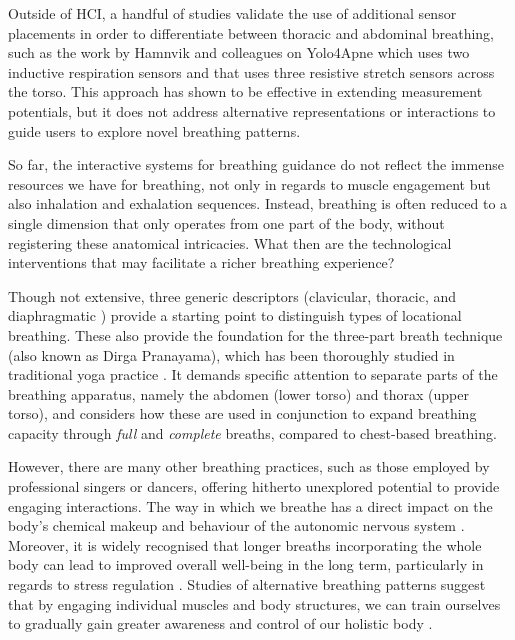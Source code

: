 Outside of HCI, a handful of studies validate the use of additional sensor placements in order to differentiate between thoracic and abdominal breathing, such as the work by Hamnvik and colleagues on Yolo4Apne \cite{hamnvik_yolo4apnea_2020} which uses two inductive respiration sensors and \cite{ejupi_detection_2018} that uses three resistive stretch sensors across the torso. This approach has shown to be effective in extending measurement potentials, but it does not address alternative representations or interactions to guide users to explore novel breathing patterns.

So far, the interactive systems for breathing guidance do not reflect the immense resources we have for breathing, not only in regards to muscle engagement but also inhalation and exhalation sequences. Instead, breathing is often reduced to a single dimension that only operates from one part of the body, without registering these anatomical intricacies. What then are the technological interventions that may facilitate a richer breathing experience?

Though not extensive, three generic descriptors (clavicular, thoracic, and diaphragmatic \cite{rama_science_1998}) provide a starting point to distinguish types of locational breathing. These also provide the foundation for the three-part breath technique (also known as Dirga Pranayama), which has been thoroughly studied in traditional yoga practice \cite{sengupta_dirga}. It demands specific attention to separate parts of the breathing apparatus, namely the abdomen (lower torso) and thorax (upper torso), and considers how these are used in conjunction to expand breathing capacity through \textit{full} and \textit{complete} breaths, compared to chest-based breathing.

However, there are many other breathing practices, such as those employed by professional singers or dancers, offering hitherto unexplored potential to provide engaging interactions. The way in which we breathe has a direct impact on the body's chemical makeup and behaviour of the autonomic nervous system \cite{russo_physiological_2017}. Moreover, it is widely recognised that longer breaths incorporating the whole body can lead to improved overall well-being in the long term, particularly in regards to stress regulation \cite{moraveji_peripheral_2011}. Studies of alternative breathing patterns suggest that by engaging individual muscles and body structures, we can train ourselves to gradually gain greater awareness and control of our holistic body \cite{van2007whole}.

